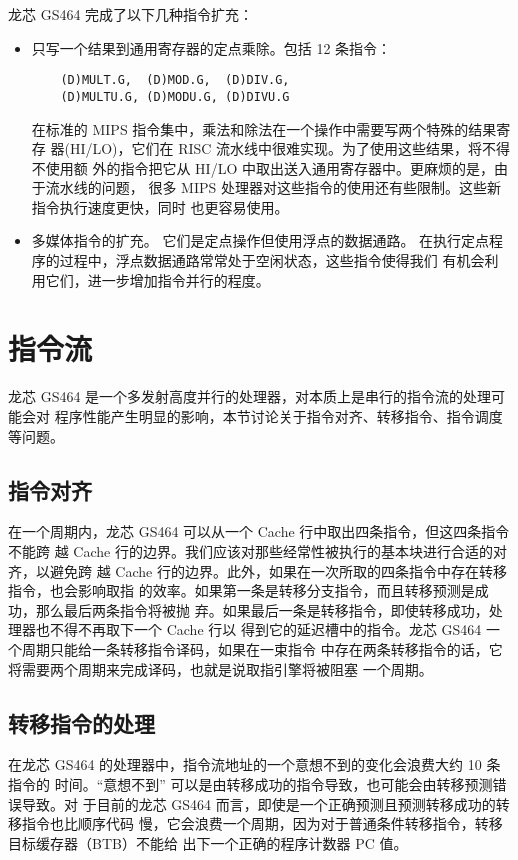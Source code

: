 龙芯 GS464 完成了以下几种指令扩充：
\begin{itemize}
  \item 只写一个结果到通用寄存器的定点乘除。包括 12 条指令：
    \begin{verbatim}
    (D)MULT.G,  (D)MOD.G,  (D)DIV.G,
    (D)MULTU.G, (D)MODU.G, (D)DIVU.G
    \end{verbatim}\vspace{-1.5em}
    在标准的 MIPS 指令集中，乘法和除法在一个操作中需要写两个特殊的结果寄存
    器(HI/LO)，它们在 RISC 流水线中很难实现。为了使用这些结果，将不得不使用额
    外的指令把它从 HI/LO 中取出送入通用寄存器中。更麻烦的是，由于流水线的问题，
    很多 MIPS 处理器对这些指令的使用还有些限制。这些新指令执行速度更快，同时
    也更容易使用。
 \item 多媒体指令的扩充。 它们是定点操作但使用浮点的数据通路。
   在执行定点程序的过程中，浮点数据通路常常处于空闲状态，这些指令使得我们
   有机会利用它们，进一步增加指令并行的程度。
\end{itemize}

\section{指令流}

龙芯 GS464 是一个多发射高度并行的处理器，对本质上是串行的指令流的处理可能会对
程序性能产生明显的影响，本节讨论关于指令对齐、转移指令、指令调度等问题。

\subsection{指令对齐}

在一个周期内，龙芯 GS464 可以从一个 Cache 行中取出四条指令，但这四条指令不能跨
越 Cache 行的边界。我们应该对那些经常性被执行的基本块进行合适的对齐，以避免跨
越 Cache 行的边界。此外，如果在一次所取的四条指令中存在转移指令，也会影响取指
的效率。如果第一条是转移分支指令，而且转移预测是成功，那么最后两条指令将被抛
弃。如果最后一条是转移指令，即使转移成功，处理器也不得不再取下一个 Cache 行以
得到它的延迟槽中的指令。龙芯 GS464 一个周期只能给一条转移指令译码，如果在一束指令
中存在两条转移指令的话，它将需要两个周期来完成译码，也就是说取指引擎将被阻塞
一个周期。

\subsection{转移指令的处理}

在龙芯 GS464 的处理器中，指令流地址的一个意想不到的变化会浪费大约 10 条指令的
时间。“意想不到” 可以是由转移成功的指令导致，也可能会由转移预测错误导致。对
于目前的龙芯 GS464 而言，即使是一个正确预测且预测转移成功的转移指令也比顺序代码
慢，它会浪费一个周期，因为对于普通条件转移指令，转移目标缓存器（BTB）不能给
出下一个正确的程序计数器 PC 值。

